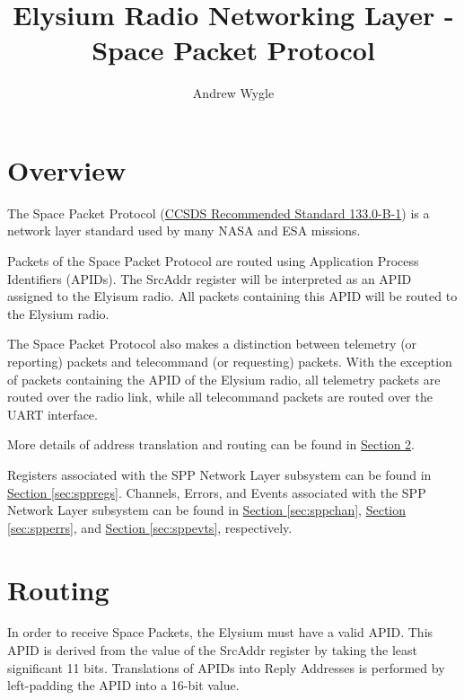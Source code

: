 \documentclass{hitec}
\author{Andrew Wygle}
\title{Elysium Radio Networking Layer - Space Packet Protocol}
\begin{document}

\maketitle

\tableofcontents
\listoffigures
\listoftables

\section{Overview}
\label{ch:overview}

The Space Packet Protocol
(\href{https://public.ccsds.org/Pubs/133x0b1c2.pdf}{CCSDS Recommended Standard
133.0-B-1}) is a network layer standard used by many NASA and ESA missions.

Packets of the Space Packet Protocol are routed using Application Process
Identifiers (APIDs). The SrcAddr register will be interpreted as an APID
assigned to the Elyisum radio. All packets containing this APID will be routed
to the Elysium radio.

The Space Packet Protocol also makes a distinction between telemetry (or
reporting) packets and telecommand (or requesting) packets. With the exception
of packets containing the APID of the Elysium radio, all telemetry packets are
routed over the radio link, while all telecommand packets are routed over the
UART interface.

More details of address translation and routing can be found in
\hyperref[sec:spproute]{Section \ref{sec:spproute}}.

Registers associated with the SPP Network Layer subsystem can be found in
\hyperref[sec:sppregs]{Section \ref{sec:sppregs}}. Channels, Errors, and Events
associated with the SPP Network Layer subsystem can be found in
\hyperref[sec:sppchan]{Section \ref{sec:sppchan}},
\hyperref[sec:spperrs]{Section \ref{sec:spperrs}}, and
\hyperref[sec:sppevts]{Section \ref{sec:sppevts}}, respectively.

\section{Routing}
\label{sec:spproute}

In order to receive Space Packets, the Elysium must have a valid APID. 
This APID is derived from the value of the SrcAddr register by taking the least
significant 11 bits. Translations of APIDs into Reply Addresses is performed by
left-padding the APID into a 16-bit value.
\end{document}
